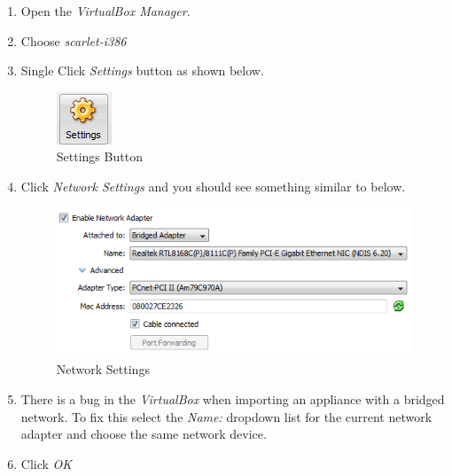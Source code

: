 \documentclass[pdftex,11pt,letterpaper]{article}
\begin{document}
\begin{enumerate}

\item Open the \textit{VirtualBox Manager}.
\item Choose \textit{scarlet-i386}
\item Single Click \textit{Settings} button as shown below.

    \begin{figure}[H]
        \begin{center}
        \leavevmode
            \includegraphics[]{scarlet_images/settings_button.png}
        \end{center}
        \caption{Settings Button}
        \label{fig:settings_button}
    \end{figure}
    
\item Click \textit{Network Settings} and you should see something similar to below.

    \begin{figure}[H]
        \begin{center}
        \leavevmode
            \includegraphics[]{scarlet_images/network_settings.png}
        \end{center}
        \caption{Network Settings}
        \label{fig:network_settings}
    \end{figure}
    
\item There is a bug in the \textit{VirtualBox} when importing an appliance with a bridged network.  To fix this select the \textit{Name:} dropdown list for the current network adapter and choose the same network device.

\item Click \textit{OK}

\end{enumerate}
\end{document}
